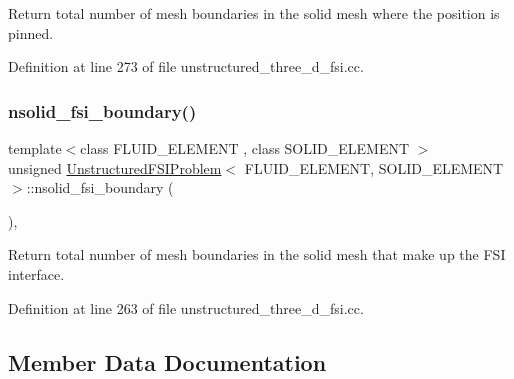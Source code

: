Return total number of mesh boundaries in the solid mesh where the position is pinned. 



Definition at line 273 of file unstructured\+\_\+three\+\_\+d\+\_\+fsi.\+cc.

\mbox{\label{classUnstructuredFSIProblem_a3e4ee23245ec4c43e085006f5cd192e1}} 
\subsubsection{\texorpdfstring{nsolid\+\_\+fsi\+\_\+boundary()}{nsolid\_fsi\_boundary()}}
{\footnotesize\ttfamily template$<$class F\+L\+U\+I\+D\+\_\+\+E\+L\+E\+M\+E\+NT , class S\+O\+L\+I\+D\+\_\+\+E\+L\+E\+M\+E\+NT $>$ \\
unsigned \hyperlink{classUnstructuredFSIProblem}{Unstructured\+F\+S\+I\+Problem}$<$ F\+L\+U\+I\+D\+\_\+\+E\+L\+E\+M\+E\+NT, S\+O\+L\+I\+D\+\_\+\+E\+L\+E\+M\+E\+NT $>$\+::nsolid\+\_\+fsi\+\_\+boundary (\begin{DoxyParamCaption}{ }\end{DoxyParamCaption})\hspace{0.3cm}{\ttfamily [inline]}, {\ttfamily [private]}}



Return total number of mesh boundaries in the solid mesh that make up the F\+SI interface. 



Definition at line 263 of file unstructured\+\_\+three\+\_\+d\+\_\+fsi.\+cc.



\subsection{Member Data Documentation}
\mbox{\label{classUnstructuredFSIProblem_a79fee04b489d1ce1f822eec9d34251e5}} 
